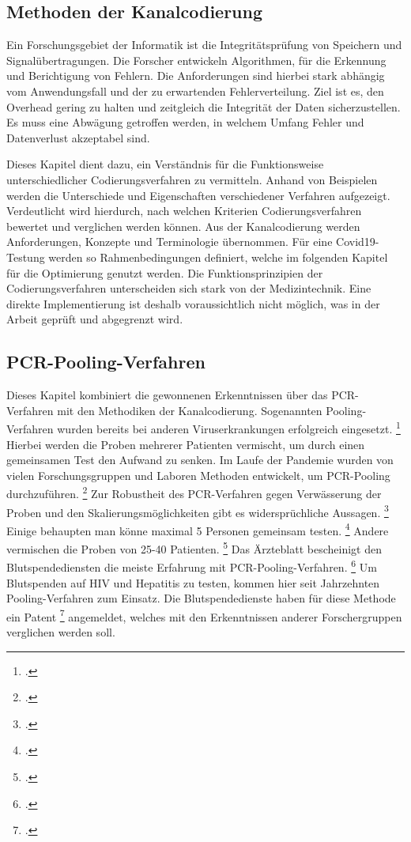 \subsection{Methoden der Kanalcodierung}
Ein Forschungsgebiet der Informatik ist die Integritätsprüfung von Speichern und Signalübertragungen.
Die Forscher entwickeln Algorithmen, für die Erkennung und Berichtigung von Fehlern.
Die Anforderungen sind hierbei stark abhängig vom Anwendungsfall und der zu erwartenden Fehlerverteilung.
Ziel ist es, den Overhead gering zu halten und zeitgleich die Integrität der Daten sicherzustellen.
Es muss eine Abwägung getroffen werden, in welchem Umfang Fehler und Datenverlust akzeptabel sind.

Dieses Kapitel dient dazu, ein Verständnis für die Funktionsweise unterschiedlicher Codierungsverfahren zu vermitteln.
Anhand von Beispielen werden die Unterschiede und Eigenschaften verschiedener Verfahren aufgezeigt.
Verdeutlicht wird hierdurch, nach welchen Kriterien Codierungsverfahren bewertet und verglichen werden können.
Aus der Kanalcodierung werden Anforderungen, Konzepte und Terminologie übernommen.
Für eine Covid19-Testung werden so Rahmenbedingungen definiert, welche im folgenden Kapitel für die Optimierung genutzt werden.
Die Funktionsprinzipien der Codierungsverfahren unterscheiden sich stark von der Medizintechnik.
Eine direkte Implementierung ist deshalb voraussichtlich nicht möglich, was in der Arbeit geprüft und abgegrenzt wird.

\subsection{PCR-Pooling-Verfahren}
Dieses Kapitel kombiniert die gewonnenen Erkenntnissen über das PCR-Verfahren mit den Methodiken der Kanalcodierung.
Sogenannten Pooling-Verfahren wurden bereits bei anderen Viruserkrankungen erfolgreich eingesetzt.
\footcite{Ärzteblatt}
Hierbei werden die Proben mehrerer Patienten vermischt, um durch einen gemeinsamen Test den Aufwand zu senken.
Im Laufe der Pandemie wurden von vielen Forschungsgruppen und Laboren Methoden entwickelt, um PCR-Pooling durchzuführen.
\footcite{Reddit Quelle}
Zur Robustheit des PCR-Verfahren gegen Verwässerung der Proben und den Skalierungsmöglichkeiten gibt es widersprüchliche Aussagen.
\footcite{Alternative Quelle Pooling}
Einige behaupten man könne maximal 5 Personen gemeinsam testen.
\footcite{Quelle}
Andere vermischen die Proben von 25-40 Patienten.
\footcite{Quelle}
Das Ärzteblatt bescheinigt den Blutspendediensten die meiste Erfahrung mit PCR-Pooling-Verfahren.
\footcite{Ärzteblatt}
Um Blutspenden auf HIV und Hepatitis zu testen, kommen hier seit Jahrzehnten Pooling-Verfahren zum Einsatz.
Die Blutspendedienste haben für diese Methode ein Patent
\footcite{Patent Blutspende}
angemeldet, welches mit den Erkenntnissen anderer Forschergruppen verglichen werden soll.

